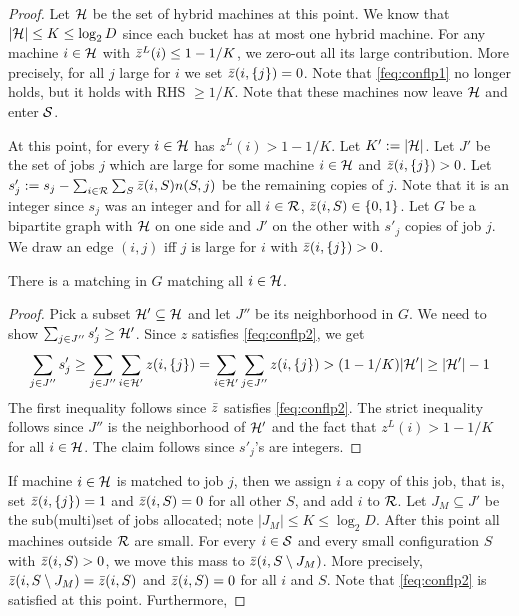 \begin{proof}

Let ${\cal H}$ be the set of hybrid machines at this point. We know that $|{\cal H}| \leq K \leq \log_2 D$ since each bucket has at most one hybrid machine.
For any machine $i\in {\cal H}$ with $\bar z^L(i) \le 1-1/K$, we zero-out all its large contribution. More precisely, for all $j$ large for $i$ we set $\bar z(i,\{j\})= 0$.
Note that \eqref{feq:conflp1} no longer holds, but it holds with RHS $\geq 1/K$. Note that these machines now leave ${\cal H}$ and enter ${\cal S}$.

At this point, for every $i\in {\cal H}$ has $z^L(i) > 1-1/K$. Let $K' := |{\cal H}|$. Let $J'$ be the set of jobs $j$ which are large for some machine $i\in {\cal H}$ and $\bar z(i,\{j\}) > 0$.
Let $s'_j := s_j - \sum_{i\in {\cal R}} \sum_S \bar z(i,S)n(S,j)$ be the remaining copies of $j$. Note that it is an integer since $s_j$ was an integer and for all $i\in {\cal R}$, $\bar z(i,S) \in \{0,1\}$.
Let $G$ be a bipartite graph with ${\cal H}$ on one side and $J'$ on the other with $s'_j$ copies of job $j$. We draw an edge $(i,j)$ iff $j$ is large for $i$ with $\bar z(i,\{j\}) > 0$.
\begin{claim}
	There is a matching in $G$ matching all $i\in {\cal H}$.
\end{claim}
\begin{proof}
Pick a subset ${\cal H}' \subseteq {\cal H}$ and let $J''$ be its neighborhood in $G$. We need to show $\sum_{j\in J''} s'_j \geq {\cal H}'$.
Since $z$ satisfies \eqref{feq:conflp2}, we get
\[
\sum_{j\in J''} s'_j \geq \sum_{j\in J''} \sum_{i\in {\cal H}'} z(i,\{j\}) = \sum_{i\in {\cal H}'} \sum_{j\in J''} z(i,\{j\})  > (1-1/K)|{\cal H}'| \geq |{\cal H}'| - 1
\]
The first inequality follows since $\bar z$ satisfies \eqref{feq:conflp2}.
The strict inequality follows since $J''$ is the neighborhood of ${\cal H}'$ and the fact that $z^L(i) > 1-1/K$ for all $i\in {\cal H}$.
The claim follows since $s'_j$'s are integers.
\end{proof}
If machine $i\in {\cal H}$ is matched to job $j$, then we assign $i$ a copy of this job, that is,  set $\bar z(i,\{j\}) = 1$ and $\bar z(i,S) = 0$ for all other $S$,
and add $i$ to ${\cal R}$. Let $J_M \subseteq J'$ be the sub(multi)set of jobs allocated; note $|J_M| \leq K \leq \log_2 D$.
After this point all machines outside ${\cal R}$ are small. For every $i\in {\cal S}$ and every small configuration $S$ with $\bar z(i,S) > 0$, we move this mass to $\bar z(i,S\setminus J_M)$.
More precisely, $\bar z(i,S\setminus J_M) = \bar z(i,S)$ and $\bar z(i,S) = 0$ for all $i$ and $S$. Note that \eqref{feq:conflp2} is satisfied at this point. Furthermore,

\end{proof}
